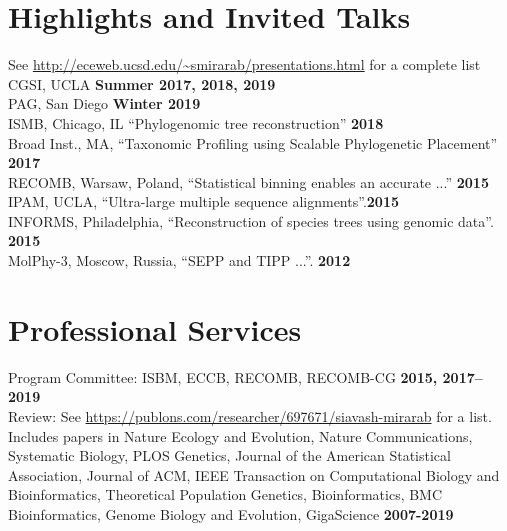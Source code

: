 \documentclass[margin,line,letterpaper]{resume}
\begin{document}
\begin{resume}
        \section{\mysidestyle Highlights and Invited Talks}
        See \url{http://eceweb.ucsd.edu/~smirarab/presentations.html} for a complete list\vspace{2mm}\\
        CGSI, UCLA \hfill \textbf{Summer 2017, 2018, 2019}\\
        PAG, San Diego  \hfill \textbf{Winter 2019}\\
        ISMB, Chicago, IL ``Phylogenomic tree reconstruction'' \hfill \textbf{2018}\\
        Broad Inst., MA, ``Taxonomic Profiling using Scalable Phylogenetic Placement'' \hfill \textbf{2017}\\
         RECOMB, Warsaw, Poland, ``Statistical binning enables an accurate ...''   \hfill \textbf{2015}\\
         IPAM, UCLA, ``Ultra-large multiple sequence alignments''.\hfill \textbf{2015}\\
         INFORMS, Philadelphia, ``Reconstruction of species trees using genomic data''.   \hfill \textbf{2015}\\
         MolPhy-3, Moscow, Russia, ``SEPP and TIPP ...''. \hfill \textbf{2012}\vspace{1mm}
    \section{\mysidestyle Professional Services}
    Program Committee: ISBM, ECCB, RECOMB, RECOMB-CG  \hfill \textbf{2015, 2017--2019}\vspace{1mm}\\
    Review:  See \url{https://publons.com/researcher/697671/siavash-mirarab} for a list. Includes papers in Nature Ecology and Evolution, Nature Communications, Systematic Biology, PLOS Genetics, Journal of the American Statistical Association, Journal of ACM, IEEE Transaction on Computational Biology and Bioinformatics, Theoretical Population Genetics, Bioinformatics, BMC Bioinformatics, Genome Biology and Evolution, GigaScience    \hfill \textbf{2007-2019}

\end{resume}
\end{document}
